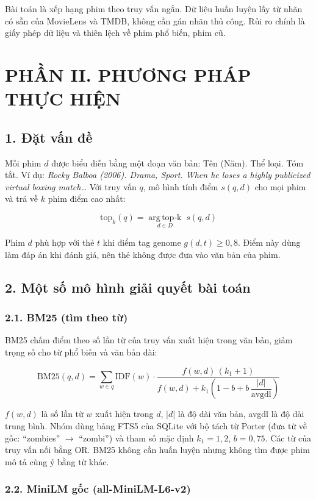 \documentclass[12pt,a4paper]{article}
\let\oldsubsection\subsection
\renewcommand{\subsection}{\Needspace{12\baselineskip}\oldsubsection}
\let\oldsubsubsection\subsubsection
\renewcommand{\subsubsection}{\Needspace{10\baselineskip}\oldsubsubsection}
\newcommand{\chap}[1]{\clearpage\section{#1}}
\begin{document}
Bài toán là xếp hạng phim theo truy vấn ngắn. Dữ liệu huấn luyện lấy từ nhãn có sẵn của MovieLens và TMDB, không cần gán nhãn thủ công. Rủi ro chính là giấy phép dữ liệu và thiên lệch về phim phổ biến, phim cũ.

\chap{PHẦN II. PHƯƠNG PHÁP THỰC HIỆN}

\subsection{1. Đặt vấn đề}

Mỗi phim $d$ được biểu diễn bằng một đoạn văn bản: Tên (Năm). Thể loại. Tóm tắt. Ví dụ: \emph{Rocky Balboa (2006). Drama, Sport. When he loses a highly publicized virtual boxing match\ldots{}} Với truy vấn $q$, mô hình tính điểm $s(q,d)$ cho mọi phim và trả về $k$ phim điểm cao nhất:

\[
\mathrm{top}_k(q) = \operatorname*{arg\,top\text{-}k}_{d \in D}\; s(q,d)
\]

Phim $d$ phù hợp với thẻ $t$ khi điểm tag genome $g(d,t) \geq 0{,}8$. Điểm này dùng làm đáp án khi đánh giá, nên thẻ không được đưa vào văn bản của phim.

\subsection{2. Một số mô hình giải quyết bài toán}

\subsubsection{2.1. BM25 (tìm theo từ)}

BM25 chấm điểm theo số lần từ của truy vấn xuất hiện trong văn bản, giảm trọng số cho từ phổ biến và văn bản dài:

\[
\mathrm{BM25}(q,d)=\sum_{w\in q}\mathrm{IDF}(w)\cdot
\frac{f(w,d)\,(k_1+1)}{f(w,d)+k_1\left(1-b+b\,\dfrac{|d|}{\mathrm{avgdl}}\right)}
\]

$f(w,d)$ là số lần từ $w$ xuất hiện trong $d$, $|d|$ là độ dài văn bản, avgdl là độ dài trung bình. Nhóm dùng bảng FTS5 của SQLite với bộ tách từ Porter (đưa từ về gốc: ``zombies'' $\rightarrow$ ``zombi'') và tham số mặc định $k_1 = 1{,}2$, $b = 0{,}75$. Các từ của truy vấn nối bằng OR. BM25 không cần huấn luyện nhưng không tìm được phim mô tả cùng ý bằng từ khác.

\subsubsection{2.2. MiniLM gốc (all-MiniLM-L6-v2)}
\end{document}
